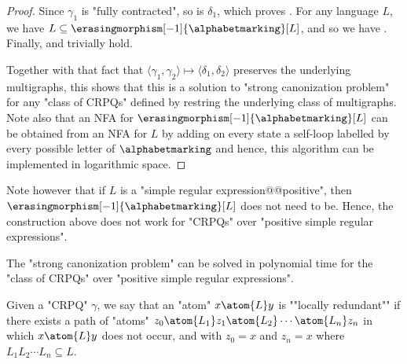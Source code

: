 \begin{proof}
	Since $\gamma_1$ is "fully contracted", so is $\delta_1$, which proves \axiomCanonContracted{}.
	For any language $L$, we have $L \subseteq \erasingmorphism[-1]{\alphabetmarking}[L]$, and so we have \axiomCanonContainment{}.
	Finally, \axiomCanonNonRed{} and \axiomCanonMarking{} trivially hold.
	
	Together with that fact that
	$\langle \gamma_1,\gamma_2 \rangle \mapsto \langle \delta_1, \delta_2\rangle$ preserves
	the underlying multigraphs, this shows that this is a solution to "strong canonization problem"
	for any "class of CRPQs" defined by restring the underlying class of multigraphs.
	Note also that an NFA for $\erasingmorphism[-1]{\alphabetmarking}[L]$ can be obtained
	from an NFA for $L$ by adding on every state a self-loop labelled by every possible letter of $\alphabetmarking$
	and hence, this algorithm can be implemented in logarithmic space.
\end{proof}

Note however that if $L$ is a "simple regular expression@@positive", then
$\erasingmorphism[-1]{\alphabetmarking}[L]$ does not need to be.
Hence, the construction above does not work for "CRPQs" over "positive simple regular expressions".

\begin{lemma}
	\AP\label{lem:canonization-SREs}
	The "strong canonization problem" can be solved in polynomial time
	for the "class of CRPQs" over "positive simple regular expressions".
\end{lemma}

Given a "CRPQ" $\gamma$, we say that an "atom" $x\atom{L} y$ is \AP""locally redundant"" if
there exists a path of "atoms" $z_0 \atom{L_1} z_1 \atom{L_2} \cdots \atom{L_n} z_n$
in which $x\atom{L} y$ does not occur, and with $z_0 = x$ and $z_n = x$
where $L_1 L_2\cdots L_n \subseteq L$.

